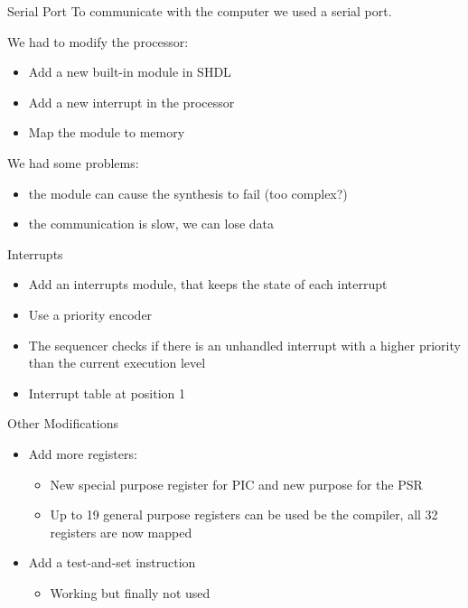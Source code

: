 \documentclass{beamer}
\begin{document}
      \begin{frame}{Serial Port}
        To communicate with the computer we used a serial port.

        \pause
        We had to modify the processor:
        \begin{itemize}
          \item Add a new built-in module in SHDL
          \item Add a new interrupt in the processor
          \item Map the module to memory
        \end{itemize}

        \pause
        We had some problems:
        \begin{itemize}
          \item the module can cause the synthesis to fail (too complex?)
          \item the communication is slow, we can lose data
        \end{itemize}
      \end{frame}

      \begin{frame}{Interrupts}
        \begin{itemize}
          \item Add an interrupts module, that keeps the state of each interrupt
          \item Use a priority encoder
          \item The sequencer checks if there is an unhandled interrupt with a
            higher priority than the current execution level
          \item Interrupt table at position 1
        \end{itemize}
      \end{frame}

      \begin{frame}{Other Modifications}
        \begin{itemize}
          \item Add more registers:
            \begin{itemize}
                \item New special purpose register for PIC and new purpose for
                  the PSR
                \item Up to 19 general purpose registers can be used be the
                  compiler, all 32 registers are now mapped
            \end{itemize}
          \pause
          \item Add a test-and-set instruction
            \begin{itemize}
                \item Working but finally not used
            \end{itemize}
        \end{itemize}
      \end{frame}
\end{document}
